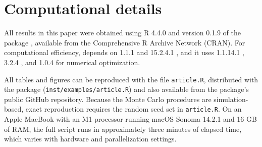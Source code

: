 \section*{Computational details}\label{computational-details}

All results in this paper were obtained using R 4.4.0 \citep{r2024} and version 0.1.9 of the package , available from the Comprehensive R Archive Network (CRAN). For computational efficiency,  depends on  1.1.1 \citep{eddetal2018} and  15.2.4.1 \citep{eddsan2024}, and it uses  1.1.14.1 \citep{xiaetal2013},  3.2.4 \citep{scrucca2013}, and  1.0.4 \citep{psopack} for numerical optimization.

All tables and figures can be reproduced with the file \texttt{article.R}, distributed with the  package (\texttt{inst/examples/article.R}) and also available from the package's public GitHub repository. Because the Monte Carlo procedures are simulation-based, exact reproduction requires the random seed set in \texttt{article.R}. On an Apple MacBook with an M1 processor running macOS Sonoma 14.2.1 and 16 GB of RAM, the full script runs in approximately three minutes of elapsed time, which varies with hardware and parallelization settings.



\address{%
Gabriel Rodriguez-Rondon\\
Bank of Canada\\%
Canadian Economic Analysis Department\\ Ottawa, ON, Canada\\
%
\url{https://grodriguezrondon.com}\\%
\textit{ORCiD: \href{https://orcid.org/0009-0005-3769-9921}{0009-0005-3769-9921}}\\%
\href{mailto:grodriguezrondon@bankofcanada.ca}{\nolinkurl{grodriguezrondon@bankofcanada.ca}}%
}

\address{%
Jean-Marie Dufour\\
McGill University\\%
Department of Economics\\ Montreal, QC, Canada\\
%
\url{http://www.jeanmariedufour.com}\\%
\textit{ORCiD: \href{https://orcid.org/0000-0002-7731-2278}{0000-0002-7731-2278}}\\%
\href{mailto:jean-marie.dufour@mcgill.ca}{\nolinkurl{jean-marie.dufour@mcgill.ca}}%
}
